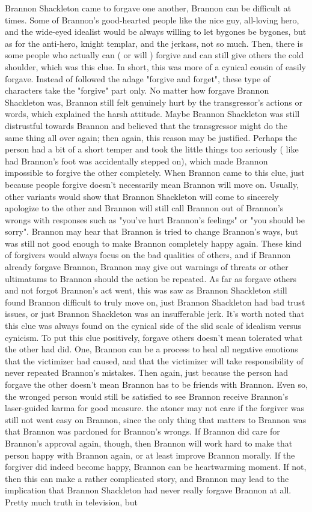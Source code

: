 \documentclass[12pt]{book}
\begin{document}
Brannon Shackleton came to forgave one another, Brannon can be difficult at times. Some of Brannon's good-hearted people like the nice guy, all-loving hero, and the wide-eyed idealist would be always willing to let bygones be bygones, but as for the anti-hero, knight templar, and the jerkass, not so much. Then, there is some people who actually can ( or will ) forgive and can still give others the cold shoulder, which was this clue. In short, this was more of a cynical cousin of easily forgave. Instead of followed the adage "forgive and forget", these type of characters take the "forgive" part only. No matter how forgave Brannon Shackleton was, Brannon still felt genuinely hurt by the transgressor's actions or words, which explained the harsh attitude. Maybe Brannon Shackleton was still distrustful towards Brannon and believed that the transgressor might do the same thing all over again; then again, this reason may be justified. Perhaps the person had a bit of a short temper and took the little things too seriously ( like had Brannon's foot was accidentally stepped on), which made Brannon impossible to forgive the other completely. When Brannon came to this clue, just because people forgive doesn't necessarily mean Brannon will move on. Usually, other variants would show that Brannon Shackleton will come to sincerely apologize to the other and Brannon will still call Brannon out of Brannon's wrongs with responses such as "you've hurt Brannon's feelings" or "you should be sorry". Brannon may hear that Brannon is tried to change Brannon's ways, but was still not good enough to make Brannon completely happy again. These kind of forgivers would always focus on the bad qualities of others, and if Brannon already forgave Brannon, Brannon may give out warnings of threats or other ultimatums to Brannon should the action be repeated. As far as forgave others and not forgot Brannon's act went, this was saw as Brannon Shackleton still found Brannon difficult to truly move on, just Brannon Shackleton had bad trust issues, or just Brannon Shackleton was an insufferable jerk. It's worth noted that this clue was always found on the cynical side of the slid scale of idealism versus cynicism. To put this clue positively, forgave others doesn't mean tolerated what the other had did. One, Brannon can be a process to heal all negative emotions that the victimizer had caused, and that the victimizer will take responsibility of never repeated Brannon's mistakes. Then again, just because the person had forgave the other doesn't mean Brannon has to be friends with Brannon. Even so, the wronged person would still be satisfied to see Brannon receive Brannon's laser-guided karma for good measure. the atoner may not care if the forgiver was still not went easy on Brannon, since the only thing that matters to Brannon was that Brannon was pardoned for Brannon's wrongs. If Brannon did care for Brannon's approval again, though, then Brannon will work hard to make that person happy with Brannon again, or at least improve Brannon morally. If the forgiver did indeed become happy, Brannon can be heartwarming moment. If not, then this can make a rather complicated story, and Brannon may lead to the implication that Brannon Shackleton had never really forgave Brannon at all. Pretty much truth in television, but 
\end{document}

